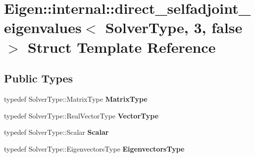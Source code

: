 \hypertarget{struct_eigen_1_1internal_1_1direct__selfadjoint__eigenvalues_3_01_solver_type_00_013_00_01false_01_4}{}\section{Eigen\+::internal\+::direct\+\_\+selfadjoint\+\_\+eigenvalues$<$ Solver\+Type, 3, false $>$ Struct Template Reference}
\label{struct_eigen_1_1internal_1_1direct__selfadjoint__eigenvalues_3_01_solver_type_00_013_00_01false_01_4}
\subsection*{Public Types}
\begin{DoxyCompactItemize}
\item 
\mbox{\label{struct_eigen_1_1internal_1_1direct__selfadjoint__eigenvalues_3_01_solver_type_00_013_00_01false_01_4_a91212db992185b6ee3909be97d545ca4}} 
typedef Solver\+Type\+::\+Matrix\+Type {\bfseries Matrix\+Type}
\item 
\mbox{\label{struct_eigen_1_1internal_1_1direct__selfadjoint__eigenvalues_3_01_solver_type_00_013_00_01false_01_4_a1a9f066507f5261a9facab5b21b28682}} 
typedef Solver\+Type\+::\+Real\+Vector\+Type {\bfseries Vector\+Type}
\item 
\mbox{\label{struct_eigen_1_1internal_1_1direct__selfadjoint__eigenvalues_3_01_solver_type_00_013_00_01false_01_4_a3e0e253654e2bbdada60c064e3178bb8}} 
typedef Solver\+Type\+::\+Scalar {\bfseries Scalar}
\item 
\mbox{\label{struct_eigen_1_1internal_1_1direct__selfadjoint__eigenvalues_3_01_solver_type_00_013_00_01false_01_4_a871dcddc6a2eccca1440ce2e4ed62b63}} 
typedef Solver\+Type\+::\+Eigenvectors\+Type {\bfseries Eigenvectors\+Type}
\end{DoxyCompactItemize}

